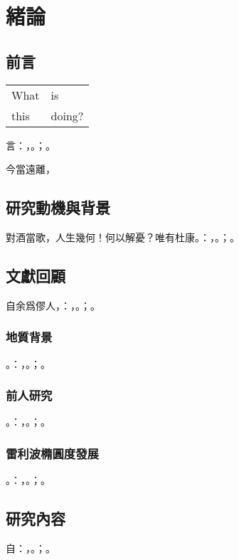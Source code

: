 
\chapter{緒論}

\section{前言}

\begingroup
\centering

\begin{tabular}{ll}
What & is \\
this & doing? \\
\end{tabular}
\captionsetup{type=table}
\label{tbl:nicetablelesstable}
\endgroup

言：，。；。\par

今當遠離，

\section{研究動機與背景}

對酒當歌，人生幾何！何以解憂？唯有杜康。：，。；。

\section{文獻回顧}

自余爲僇人，：，。；。
\subsection{地質背景}
。：，。；。
\subsection{前人研究}
。：，。；。
\subsection{雷利波橢圓度發展}
。：，。；。
\section{研究內容}

自：，。；。